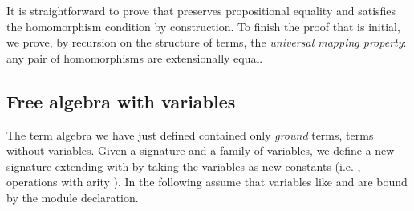 \noindent It is straightforward to prove that 
preserves propositional equality and satisfies the homomorphism
condition by construction. To finish the proof that 
 is initial, we prove, by recursion on the structure of
terms, the \emph{universal mapping property}: any pair of homomorphisms
are extensionally equal.

\subsection{Free algebra with variables}
The term algebra we have just defined contained only \emph{ground}
terms, \ie terms without variables. Given a signature 
and
\AgdaSpace{}\AgdaSymbol{:}\AgdaSpace{}\AgdaSpace{}
\AgdaSpace{}\AgdaSpace{}
a family of variables, we define a new signature extending
 with  by taking the variables as new
constants (i.e. , operations with arity
\AgdaInductiveConstructor{[]}). In the following assume that
variables like  and  are bound by the module
declaration.

\begin{code}
\>[2]\AgdaSpace{}%
\AgdaSymbol{:}\AgdaSpace{}%
\<%
\\
%
\>[2]\AgdaSpace{}%
\AgdaSymbol{=}\AgdaSpace{}%
%
\>[17]\AgdaSymbol{\{}%
\>[512I]\AgdaSpace{}%
\AgdaSymbol{=}\AgdaSpace{}%
\AgdaSpace{}%
\<%
\\
\>[.][@{}l@{}]\<[512I]%
\>[19]\AgdaSymbol{;}\AgdaSpace{}%
\AgdaSpace{}%
\AgdaSymbol{=}%
\>[518I]\AgdaSpace{}%
\AgdaSymbol{\{}\AgdaSpace{}%
\AgdaSymbol{(}\AgdaInductiveConstructor{[]}\AgdaSpace{}%
\AgdaOperator{\AgdaInductiveConstructor{,}}\AgdaSpace{}%
\AgdaSymbol{)}\AgdaSpace{}%
\AgdaSpace{}%
\AgdaSpace{}%
\AgdaSpace{}%
\AgdaSymbol{(}\AgdaInductiveConstructor{[]}\AgdaSpace{}%
\AgdaOperator{\AgdaInductiveConstructor{,}}\AgdaSpace{}%
\AgdaSymbol{)}\AgdaSpace{}%
\AgdaSpace{}%
\AgdaSpace{}%
\<%
\\
\>[518I][@{}l@{\AgdaIndent{0}}]%
\>[28]\AgdaSymbol{;}\AgdaSpace{}%
\AgdaSymbol{(}\AgdaSpace{}%
\AgdaSpace{}%
\AgdaSpace{}%
\AgdaOperator{\AgdaInductiveConstructor{,}}\AgdaSpace{}%
\AgdaSymbol{)}\AgdaSpace{}%
\AgdaSpace{}%
\AgdaSpace{}%
\AgdaSpace{}%
\AgdaSymbol{(}\AgdaSpace{}%
\AgdaSpace{}%
\AgdaSpace{}%
\AgdaOperator{\AgdaInductiveConstructor{,}}\AgdaSpace{}%
\AgdaSymbol{)}\<%
\\
%
\>[28]\AgdaSymbol{\}}\<%
\\
%
\>[19]\AgdaSymbol{\}}\<%
\\
\end{code}

